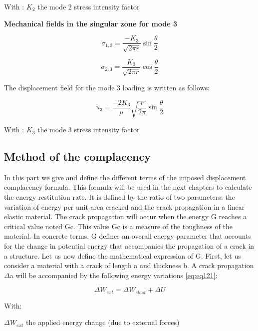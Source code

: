 With : $K_2$  the mode 2 stress intensity factor

\smallskip

\textbf{Mechanical fields in the singular zone for mode 3}

\begin{equation}
	\sigma_{1,3} = \frac{-K_{3}}{\sqrt{2 \pi r}} \sin{\frac{\theta}{2}}
	\label{eq:eq118}
\end{equation}

\begin{equation}
	\sigma_{2,3} = \frac{K_{3}}{\sqrt{2 \pi r}} \cos{\frac{\theta}{2}}
	\label{eq:eq119}
\end{equation}

The displacement field for the mode 3 loading is written as follows:

\begin{equation}
	u_{3} = \frac{-2 K_{3}}{\mu} \sqrt{\frac{r}{2 \pi}} \sin{\frac{\theta}{2}}
	\label{eq:eq120}
\end{equation}

With : $K_3$  the mode 3 stress intensity factor

\subsection{Method of the complacency}

In this part we give and define the different terms of the imposed displacement complacency formula. This formula will be used in the next chapters to calculate the energy restitution rate. It is defined by the ratio of two parameters: the variation of energy per unit area cracked and the crack propagation in a linear elastic material. The crack propagation will occur when the energy G reaches a critical value noted Gc. This value Gc is a measure of the toughness of the material. In concrete terms, G defines an overall energy parameter that accounts for the change in potential energy that accompanies the propagation of a crack in a structure. Let us now define the mathematical expression of G. First, let us consider a material with a crack of length a and thickness b. A crack propagation $\Delta$a will be accompanied by the following energy variations \ref{eq:eq121}:

\begin{equation}
	\Delta W_{ext}=\Delta W_{elast}+\Delta U
	\label{eq:eq121}
\end{equation}

With:

$\Delta W_{ext}$ the applied energy change (due to external forces)

